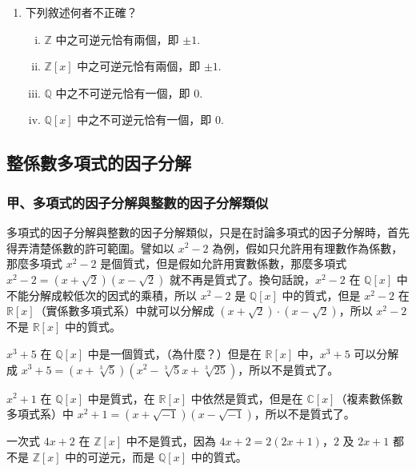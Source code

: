 \begin{enumerate}[1.]
  \item 下列敘述何者不正確？
  \begin{enumerate}[(i)]
    \item $\mathbb{Z}$ 中之可逆元恰有兩個，即 $\pm 1$.
    \item $\mathbb{Z}[x]$ 中之可逆元恰有兩個，即 $\pm 1$.
    \item $\mathbb{Q}$ 中之不可逆元恰有一個，即 $0$.
    \item $\mathbb{Q}[x]$ 中之不可逆元恰有一個，即 $0$.
  \end{enumerate}
\end{enumerate}

\subsection{整係數多項式的因子分解}\label{sec:7-2}

\subsubsection*{甲、多項式的因子分解與整數的因子分解類似}\label{subsec:7-2-a}

多項式的因子分解與整數的因子分解類似，只是在討論多項式的因子分解時，首先得弄清楚係數的許可範圍。譬如以 $x^2-2$ 為例，假如只允許用有理數作為係數，那麼多項式 $x^2-2$ 是個質式，但是假如允許用實數係數，那麼多項式 $x^2-2 = (x+\sqrt{2})(x-\sqrt{2})$ 就不再是質式了。換句話說，$x^2-2$ 在 $\mathbb{Q}[x]$ 中不能分解成較低次的因式的乘積，所以 $x^2-2$ 是 $\mathbb{Q}[x]$ 中的質式，但是 $x^2-2$ 在 $\mathbb{R}[x]$（實係數多項式系）中就可以分解成 $(x+\sqrt{2}) \cdot (x-\sqrt{2})$，所以 $x^2-2$ 不是 $\mathbb{R}[x]$ 中的質式。

\begin{example}\label{ex:7-2-1}
$x^3+5$ 在 $\mathbb{Q}[x]$ 中是一個質式，（為什麼？）但是在 $\mathbb{R}[x]$ 中，$x^3+5$ 可以分解成 $x^3+5 = (x+\sqrt[3]{5})(x^2-\sqrt[3]{5}x+\sqrt[3]{25})$，所以不是質式了。
\end{example}

\begin{example}\label{ex:7-2-2}
$x^2+1$ 在 $\mathbb{Q}[x]$ 中是質式，在 $\mathbb{R}[x]$ 中依然是質式，但是在 $\mathbb{C}[x]$（複素數係數多項式系）中 $x^2+1 = (x+\sqrt{-1})(x-\sqrt{-1})$，所以不是質式了。
\end{example}

\begin{example}\label{ex:7-2-3}
一次式 $4x+2$ 在 $\mathbb{Z}[x]$ 中不是質式，因為 $4x+2 = 2(2x+1)$，$2$ 及 $2x+1$ 都不是 $\mathbb{Z}[x]$ 中的可逆元，而是 $\mathbb{Q}[x]$ 中的質式。
\end{example}

